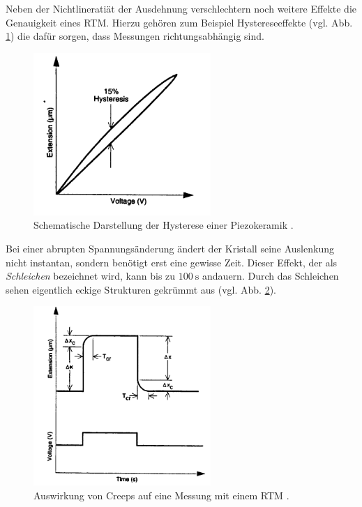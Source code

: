 Neben der Nichtlineratiät der Ausdehnung verschlechtern noch weitere
Effekte die Genauigkeit eines RTM. Hierzu gehören zum Beispiel Hystereseeffekte (vgl. Abb. \ref{fig: hysterese}) die dafür sorgen,
dass Messungen richtungsabhängig sind.
\begin{figure}[!h]
  \centering
  \includegraphics[width=0.6\textwidth]{./pics/hysterese.png}
  \caption{Schematische Darstellung der Hysterese einer Piezokeramik \cite{rtm}.}
  \label{fig: hysterese}
\end{figure}
Bei einer abrupten Spannungsänderung ändert der Kristall seine Auslenkung nicht instantan, sondern benötigt erst eine gewisse Zeit.
Dieser Effekt, der als \emph{Schleichen} bezeichnet wird, kann bis zu $\SI{100}{\second}$ andauern.
Durch das Schleichen sehen eigentlich eckige Strukturen gekrümmt aus (vgl. Abb. \ref{fig: creep}).
\begin{figure}[!h]
  \centering
  \includegraphics[width=0.6\textwidth]{./pics/creep.png}
  \caption{Auswirkung von Creeps auf eine Messung mit einem RTM \cite{rtm}.}
  \label{fig: creep}
\end{figure}
